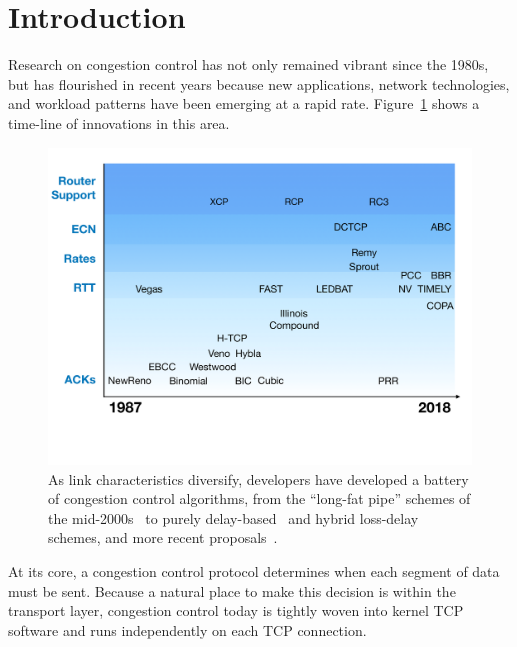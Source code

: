 \section{Introduction}

Research on congestion control has not only remained vibrant since the 1980s, but has flourished in recent years because new applications, network technologies, and workload patterns have been emerging at a rapid rate. Figure~\ref{fig:cctimeline} shows a time-line of innovations in this area.

\begin{figure}[t]
\centering
    \includegraphics[width=\columnwidth]{img/cc-timeline}
    \vspace{-1cm}
    \caption{As link characteristics diversify, developers have developed a battery of congestion control algorithms, from the ``long-fat pipe'' schemes of the mid-2000s~\cite{westwood, veno, htcp, hybla} to purely delay-based~\cite{vegas, fasttcp, ledbat, nv, timely} and hybrid loss-delay~\cite{illinois, compound} schemes, and more recent proposals~\cite{pcc, remy, sprout, bbr, copa, abc}.}\label{fig:cctimeline}
\end{figure}

At its core, a congestion control protocol determines when each segment of data must be sent. Because a natural place to make this decision is within the transport layer, congestion control today is tightly woven into kernel TCP software and runs independently on each TCP connection.


